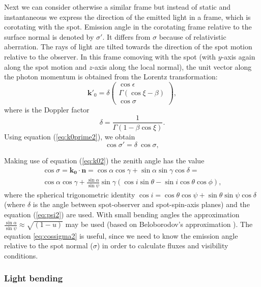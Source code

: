 \documentclass{wihuri}
\def\be{\begin{equation}}
\def\ee{\end{equation}}
\def\Dop{\delta}
\newcommand{\bmath}[1]{\boldsymbol{#1}}
\begin{document}
Next we can consider otherwise a similar frame but instead of static and instantaneous we express the direction of the emitted light in a frame, which is corotating with the spot. Emission angle in the corotating frame relative to the surface normal is denoted by
$\sigma'$.  It differs from $\sigma$ because of relativistic aberration. The rays of light are tilted towards the direction of the spot motion relative to the observer.
In this frame comoving with the spot 
(with $y$-axis again along the spot motion and $z$-axis along the local normal), 
the unit vector along the photon momentum  is 
obtained from the Lorentz transformation: 
\be \label{eq:k0prime2}
\bmath{k}'_0 = \Dop
\left( \begin{array}{c}
\cos \epsilon \\
\Gamma (\cos\xi-\beta)\\ 
\cos\sigma
\end{array}
\right) ,
\ee 
where is the Doppler factor 
\be \label{eq:dop2}
\Dop=\frac{1}{\Gamma(1-\beta\cos\xi)} .
\ee
Using equation (\ref{eq:k0prime2}), we obtain
\be \label{eq:aberr2}
\cos\sigma' =   \Dop \ \cos\sigma ,
\ee
 
Making use of equation (\ref{eq:k02}) the zenith angle has the value
\be\label{eq:cossigma2}
\begin{split}
\cos\sigma = \bmath{k_{0}}\cdot\bmath{n} = \cos\alpha\cos\gamma+\sin\alpha\sin\gamma\cos\delta = \\
\cos \alpha  \cos \gamma + \frac{\sin \alpha}{\sin \psi} \sin \gamma (\cos i \sin \theta - \sin i \cos \theta \cos \phi),
\end{split}
\ee
where the spherical trigonometric identity $\cos i = \cos\theta\cos\psi+\sin\theta\sin\psi\cos\delta$ (where $\delta$ is the angle between spot-observer and spot-spin-axis planes) and the equation (\ref{eq:psi2}) are used. With small bending angles the approximation $\frac{\sin \alpha}{\sin \psi} \approx \sqrt{(1-u)}$ may be used (based on Beloborodov's approximation \cite{beloborodov}). 
The equation \ref{eq:cossigma2} is useful, since we need to know the emission angle relative to the spot normal ($\sigma$) in order to calculate fluxes and visibility conditions. 


\subsubsection{Light bending}
\end{document}
